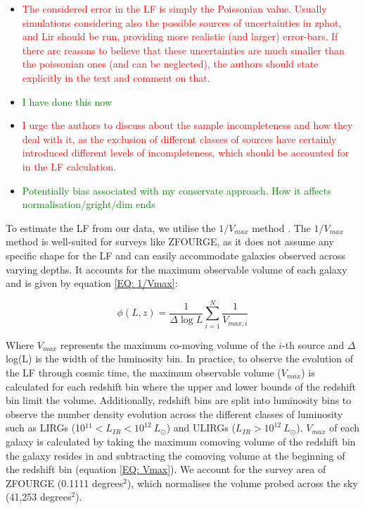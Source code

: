 \begin{itemize}
    \item \textcolor{red}{The considered error in the LF is simply the Poissonian value. Usually simulations considering also the possible sources of uncertainties in zphot, and Lir should be run, providing more realistic (and larger) error-bars. If there are reasons to believe that these uncertainties are much smaller than the poissonian ones (and can be neglected), the authors should state explicitly in the text and comment on that.}
    \item \textcolor{green}{I have done this now}
    
    \item \textcolor{red}{I urge the authors to discuss about the sample incompleteness and how they deal with it, as the exclusion of different classes of sources have certainly introduced different levels of incompleteness, which should be accounted for in the LF calculation.}
    \item \textcolor{green}{Potentially bias associated with my conservate approach. How it affects normalisation/gright/dim ends}
\end{itemize}

To estimate the LF from our data, we utilise the $1/V_{max}$ method \citep{schmidt_space_1968}. The $1/V_{max}$ method is well-suited for surveys like ZFOURGE, as it does not assume any specific shape for the LF and can easily accommodate galaxies observed across varying depths. It accounts for the maximum observable volume of each galaxy and is given by equation \ref{EQ: 1/Vmax}:

\begin{equation} \label{EQ: 1/Vmax}
    \phi(L,z) = \frac{1}{\Delta \log L}\sum_{i=1}^N \frac{1}{V_{max,i}}
\end{equation}

Where $V_{max}$ represents the maximum co-moving volume of the $i$-th source and $\Delta$ log(L) is the width of the luminosity bin. In practice, to observe the evolution of the LF through cosmic time, the maximum observable volume ($V_{max}$) is calculated for each redshift bin where the upper and lower bounds of the redshift bin limit the volume. Additionally, redshift bins are split into luminosity bins to observe the number density evolution across the different classes of luminosity such as LIRGs (10$^{11} < L_{IR} < 10^{12}\ L_{\odot}$) and ULIRGs ($L_{IR} > 10^{12}\ L_{\odot}$). $V_{max}$ of each galaxy is calculated by taking the maximum comoving volume of the redshift bin the galaxy resides in and subtracting the comoving volume at the beginning of the redshift bin (equation \ref{EQ: Vmax}). We account for the survey area of ZFOURGE (0.1111 degrees$^2$), which normalises the volume probed across the sky (41,253 degrees$^2$). 

